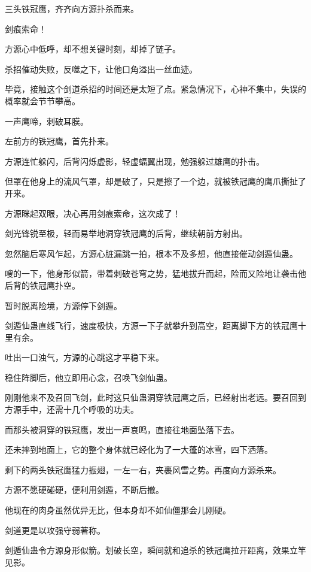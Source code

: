 
\begin{this_body}



三头铁冠鹰，齐齐向方源扑杀而来。

剑痕索命！

方源心中低呼，却不想关键时刻，却掉了链子。

杀招催动失败，反噬之下，让他口角溢出一丝血迹。

毕竟，接触这个剑道杀招的时间还是太短了点。紧急情况下，心神不集中，失误的概率就会节节攀高。

一声鹰啼，刺破耳膜。

左前方的铁冠鹰，首先扑来。

方源连忙躲闪，后背闪烁虚影，轻虚蝠翼出现，勉强躲过雄鹰的扑击。

但罩在他身上的流风气罩，却是破了，只是擦了一个边，就被铁冠鹰的鹰爪撕扯了开来。

方源眯起双眼，决心再用剑痕索命，这次成了！

剑光锋锐至极，轻而易举地洞穿铁冠鹰的后背，继续朝前方射出。

忽然脑后寒风乍起，方源心脏漏跳一拍，根本不及多想，他直接催动剑遁仙蛊。

嗖的一下，他身形似箭，带着刺破苍穹之势，猛地拔升而起，险而又险地让袭击他后背的铁冠鹰扑空。

暂时脱离险境，方源停下剑遁。

剑遁仙蛊直线飞行，速度极快，方源一下子就攀升到高空，距离脚下方的铁冠鹰十里有余。

吐出一口浊气，方源的心跳这才平稳下来。

稳住阵脚后，他立即用心念，召唤飞剑仙蛊。

刚刚他来不及召回飞剑，此时这只仙蛊洞穿铁冠鹰之后，已经射出老远。要召回到方源手中，还需十几个呼吸的功夫。

而那头被洞穿的铁冠鹰，发出一声哀鸣，直接往地面坠落下去。

还未摔到地面上，它的整个身体就已经化为了一大蓬的冰雪，四下洒落。

剩下的两头铁冠鹰猛力振翅，一左一右，夹裹风雪之势。再度向方源杀来。

方源不愿硬碰硬，便利用剑遁，不断后撤。

他现在的肉身虽然优异无比，但本身却不如仙僵那会儿刚硬。

剑道更是以攻强守弱著称。

剑遁仙蛊令方源身形似箭。划破长空，瞬间就和追杀的铁冠鹰拉开距离，效果立竿见影。


\end{this_body}

